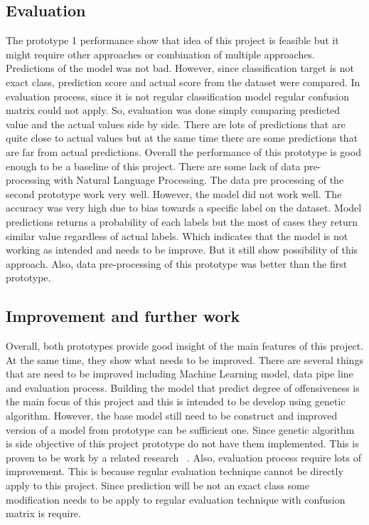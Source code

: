 \documentclass[12pt, natbib=false]{article}
\begin{document}
\subsection{Evaluation}
The prototype 1 performance show that idea of this project is feasible but it might require other approaches or combination of multiple approaches.
Predictions of the model was not bad. However, since classification target is not exact class, prediction score and actual score from the dataset were compared.
In evaluation process, since it is not regular classification model regular confusion matrix could not apply. So, evaluation was done simply comparing predicted value and the actual values side by side.
There are lots of predictions that are quite close to actual values but at the same time there are some predictions that are far from actual predictions.
Overall the performance of this prototype is good enough to be a baseline of this project.
There are some lack of data pre-processing with Natural Language Processing. The data pre processing of the second prototype work very well.
However, the model did not work well.
The accuracy was very high due to bias towards a specific label on the dataset. Model predictions returns a probability of each labels but the most of cases they return similar value regardless of actual labels.
Which indicates that the model is not working as intended and needs to be improve.
But it still show possibility of this approach.
Also, data pre-processing of this prototype was better than the first prototype.

\subsection{Improvement and further work}
Overall, both prototypes provide good insight of the main features of this project.
At the same time, they show what needs to be improved.
There are several things that are need to be improved including Machine Learning model, data pipe line and evaluation process.
Building the model that predict degree of offensiveness is the main focus of this project and this is intended to be develop using genetic algorithm.
However, the base model still need to be construct and improved version of a model from prototype can be sufficient one.
Since genetic algorithm is side objective of this project prototype do not have them implemented.
This is proven to be work by a related research ~\cite{andersen2021evolving}.
Also, evaluation process require lots of improvement.
This is because regular evaluation technique cannot be directly apply to this project.
Since prediction will be not an exact class some modification needs to be apply to regular evaluation technique with confusion matrix is require.
\end{document}
